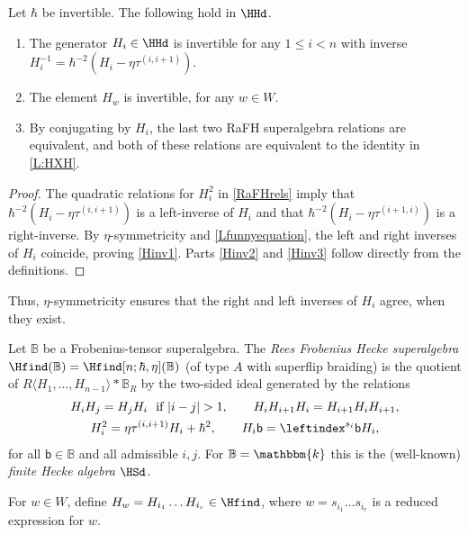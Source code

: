 \documentclass[a4paper,11pt]{amsart}
\let\<\langle
\let\>\rangle
\numberwithin{equation}{subsection}
\theoremstyle{definition}
\theoremstyle{theorem}
\theoremstyle{remark}
\newcommand\Sym{W}
\newcommand\bb{\mathsf{b}}
\newcommand\kk{\mathbbm{k}}
\newcommand{\Bo}{\mathbb{B}}
\begin{document}
\begin{Lemma}\label{Rk:hinv}Let $\hbar$ be invertible. The following hold in $\HHd$.
\begin{enumerate}
\item\label{Hinv1} The generator   $H_i\in\HHd$ is  invertible for any $1\leq i<
  n$ with inverse  $H_i^{-1}=\hbar^{-2}(H_i-\eta\tau^{(i,i+1)})$.
\item\label{Hinv2}  The element $H_w$ is invertible, for any $w\in\Sym$.
\item\label{Hinv3}  By conjugating by $H_i$, the last two RaFH superalgebra relations are
  equivalent, and both of these relations are equivalent to the identity
  in \autoref{L:HXH}.
\end{enumerate}
\end{Lemma}
\begin{proof} The quadratic relations for $H_i^2$ in \autoref{RaFHrels} imply that
  $\hbar^{-2}(H_i-\eta\tau^{(i,i+1)})$ is a left-inverse of $H_i$ and
  that $\hbar^{-2}(H_i-\eta\tau^{(i+1,i)})$ is a right-inverse. By
  $\eta$-symmetricity and \autoref{Lfunnyequation}, the left and right
  inverses of $H_i$ coincide, proving \autoref{Hinv1}. Parts
  \autoref{Hinv2} and \autoref{Hinv3} follow directly from the definitions.
\end{proof}

Thus, $\eta$-symmetricity ensures that the right and left
inverses of $H_i$ agree, when they exist.

\begin{Definition}\label{D:RFHS}
  Let $\Bo$ be a Frobenius-tensor superalgebra. The \emph{Rees Frobenius Hecke superalgebra} $\Hfind(\Bo)=\Hfind[n;\hbar,\eta](\Bo)$
  (of type $A$ with superflip braiding)  is the quotient of
  $ R\<H_1,\dots,H_{n-1}\>\ast\Bo_R$ by the two-sided ideal generated by the relations
  \begin{equation}\label{RFHSrels}
  \begin{gathered}
    H_iH_j=H_jH_i\ \text{ if }|i-j|>1,\qquad H_iH_{i+1}H_i=H_{i+1}H_iH_{i+1},\\
    H_i^2=\eta\tau^{(i,i+1)}H_i+\hbar^2,\qquad H_i\bb=\leftindex^{s_i}{\bb}H_i,
  \end{gathered}
  \end{equation}
  for all $\bb\in\Bo$ and all admissible $i,j$. For $\Bo=\kk$ this is the (well-known) \emph{finite Hecke algebra} $\HSd$.
\end{Definition}
For $w\in \Sym$, define $H_w=H_{i_1}\dots H_{i_r}\in\Hfind$, where
  $w=s_{i_1}\dots s_{i_r}$ is a reduced expression for $w$.
\end{document}

